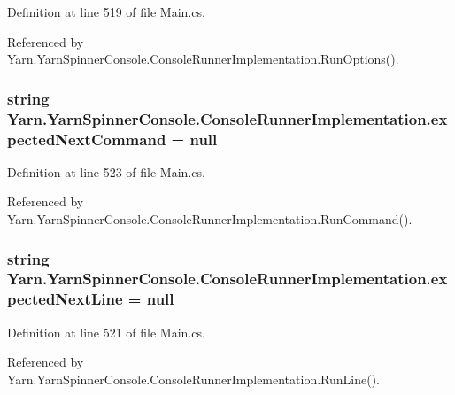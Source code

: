 Definition at line 519 of file Main.\-cs.



Referenced by Yarn.\-Yarn\-Spinner\-Console.\-Console\-Runner\-Implementation.\-Run\-Options().

\hypertarget{a00050_a3c7133c65dc7cf293f49b61426a0c4aa}{
\subsubsection[{expected\-Next\-Command}]{\setlength{\rightskip}{0pt plus 5cm}string Yarn.\-Yarn\-Spinner\-Console.\-Console\-Runner\-Implementation.\-expected\-Next\-Command = null}}\label{a00050_a3c7133c65dc7cf293f49b61426a0c4aa}


Definition at line 523 of file Main.\-cs.



Referenced by Yarn.\-Yarn\-Spinner\-Console.\-Console\-Runner\-Implementation.\-Run\-Command().

\hypertarget{a00050_a33a44e39f2d90850cee234dfad50f2c5}{
\subsubsection[{expected\-Next\-Line}]{\setlength{\rightskip}{0pt plus 5cm}string Yarn.\-Yarn\-Spinner\-Console.\-Console\-Runner\-Implementation.\-expected\-Next\-Line = null}}\label{a00050_a33a44e39f2d90850cee234dfad50f2c5}


Definition at line 521 of file Main.\-cs.



Referenced by Yarn.\-Yarn\-Spinner\-Console.\-Console\-Runner\-Implementation.\-Run\-Line().


